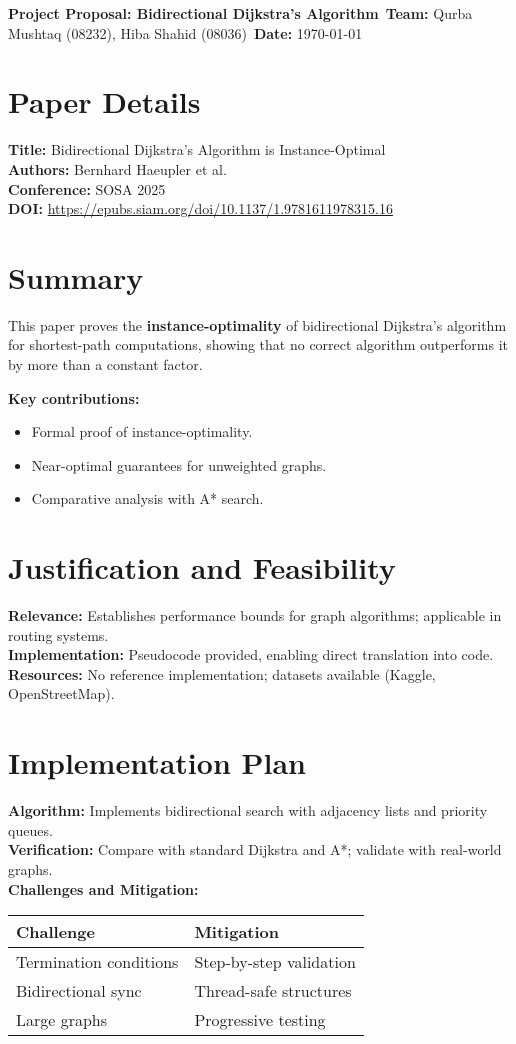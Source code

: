 \documentclass[10pt]{article}
\begin{document}
\noindent\textbf{Project Proposal: Bidirectional Dijkstra's Algorithm}\
\textbf{Team:} Qurba Mushtaq (08232), Hiba Shahid (08036)\
\textbf{Date:} \today

\section*{Paper Details}
\textbf{Title:} Bidirectional Dijkstra's Algorithm is Instance-Optimal\\
\textbf{Authors:} Bernhard Haeupler et al.\\
\textbf{Conference:} SOSA 2025\\
\textbf{DOI:} \url{https://epubs.siam.org/doi/10.1137/1.9781611978315.16}

\section*{Summary}
This paper proves the \textbf{instance-optimality} of bidirectional Dijkstra's algorithm for shortest-path computations, showing that no correct algorithm outperforms it by more than a constant factor.

\textbf{Key contributions:}
\begin{itemize}
    \item Formal proof of instance-optimality.
    \item Near-optimal guarantees for unweighted graphs.
    \item Comparative analysis with A* search.
\end{itemize}

\section*{Justification and Feasibility}
\textbf{Relevance:} Establishes performance bounds for graph algorithms; applicable in routing systems.\\
\textbf{Implementation:} Pseudocode provided, enabling direct translation into code.\\
\textbf{Resources:} No reference implementation; datasets available (Kaggle, OpenStreetMap).

\section*{Implementation Plan}
\textbf{Algorithm:} Implements bidirectional search with adjacency lists and priority queues.\\
\textbf{Verification:} Compare with standard Dijkstra and A*; validate with real-world graphs.\\
\textbf{Challenges and Mitigation:}
\begin{tabular}{p{4.5cm}|p{4.5cm}}
\toprule
\textbf{Challenge} & \textbf{Mitigation} \\
\midrule
Termination conditions & Step-by-step validation \\
Bidirectional sync & Thread-safe structures \\
Large graphs & Progressive testing \\
\bottomrule
\end{tabular}
\end{document}
